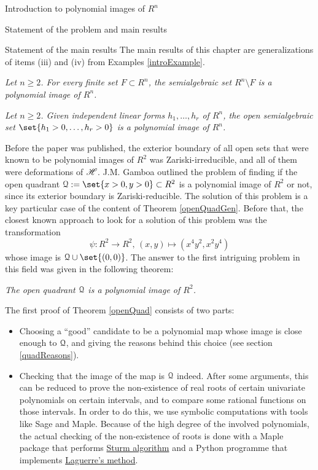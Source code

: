 \documentclass[11pt, a4paper, english, twoside, notitlepage, openright]{report}
\begin{document}
\begin{chapter}{Introduction to polynomial images of $R^n$}
\begin{section}{Statement of the problem and main results}
\begin{subsection}{Statement of the main results}
The main results of this chapter are generalizations of items (iii) and (iv) from Examples \ref{introExample}.
\begin{theorem}\label{finSetTh}\em Let $n\ge2$. For every finite set $F\subset R^n$, the semialgebraic set $R^n\setminus F$ is a polynomial image of $R^n$.\em
\end{theorem}
\begin{theorem}\label{openQuadGen}\em Let $n\ge 2$. Given independent linear forms $h_1,\dots,h_r$ of $R^n$, the open semialgebraic set $\set{h_1>0,\dots,h_r>0}$ is a polynomial image of $R^n$.\em
\end{theorem}
	
Before the paper \cite{fg} was published, the exterior boundary of all open sets that were known to be polynomial images of $R^2$ was Zariski-irreducible, and all of them were deformations of $\mathscr{H}$. J.M. Gamboa outlined the problem of finding if the open quadrant $\Qu:=\set{x>0,y>0}\subset R^2$ is a polynomial image of $R^2$ or not, since its exterior boundary is Zariski-reducible. The solution of this problem is a key particular case of the content of Theorem \ref{openQuadGen}. Before that, the closest known approach to look for a solution of this problem was the transformation
$$
\psi:R^2 \to R^2,\, (x,y)\mapsto(x^4y^2,x^2y^4)
$$	
whose image is $\Qu\cup\set{(0,0)}$. The answer to the first intriguing problem in this field was given in the following theorem:

\newpage
\begin{theorem}\label{openQuad}\em The open quadrant $\mathcal{Q}$ is a polynomial image of $R^2$.\em
\end{theorem}
	
\begin{remark} The first proof of Theorem \ref{openQuad} consists of two parts:
\begin{itemize}
\item Choosing a ``good'' candidate to be a polynomial map whose image is close enough to $\mathcal{Q}$, and giving the reasons behind this choice (see section \ref{quadReasons}). 
	
\item Checking that the image of the map is $\mathcal{Q}$ indeed. After some arguments, this can be reduced to prove the non-existence of real roots of certain univariate polynomials on certain intervals, and to compare some rational functions on those intervals. In order to do this, we use symbolic computations with tools like Sage and Maple. Because of the high degree of the involved polynomials, the actual checking of the non-existence of roots is done with a Maple package that performs \hyperref[sturm]{Sturm algorithm} and a Python programme that implements \hyperref[laguerre] {Laguerre's method}.
\end{itemize}
\end{remark}


\end{subsection}
\end{section}
\end{chapter}
\end{document}
